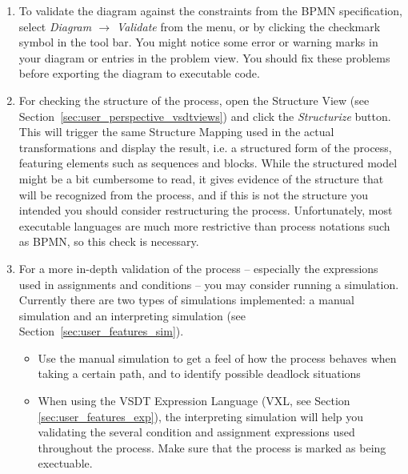 \begin{enumerate}

	\item To validate the diagram against the constraints from the BPMN
	specification, select \emph{Diagram $\rightarrow$ Validate} from the menu, or
	by clicking the checkmark symbol in the tool bar.  You might notice some error
	or warning marks in your diagram or entries in the problem view.  You should
	fix these problems before exporting the diagram to executable code.
	
	\item For checking the structure of the process, open the Structure View (see
	Section~\ref{sec:user_perspective_vsdtviews}) and click the \emph{Structurize}
	button.  This will trigger the same Structure Mapping used in the actual
	transformations and display the result, i.e. a structured form of the process,
	featuring elements such as sequences and blocks.  While the structured model
	might be a bit cumbersome to read, it gives evidence of the structure that
	will be recognized from the process, and if this is not the structure you
	intended you should consider restructuring the process.  Unfortunately, most
	executable languages are much more restrictive than process notations such as
	BPMN, so this check is necessary.
	
	\item For a more in-depth validation of the process -- especially the expressions
	used in assignments and conditions -- you may consider running a simulation.
	Currently there are two types of simulations implemented: a manual simulation
	and an interpreting simulation (see Section~\ref{sec:user_features_sim}).
	\begin{itemize}
		\item Use the manual simulation to get a feel of how the process behaves
		when taking a certain path, and to identify possible deadlock situations
		
		\item When using the VSDT Expression Language (VXL, see Section
		\ref{sec:user_features_exp}), the interpreting simulation will help you
		validating the several condition and assignment expressions used throughout
		the process. Make sure that the process is marked as being exectuable.
	\end{itemize}

\end{enumerate}



